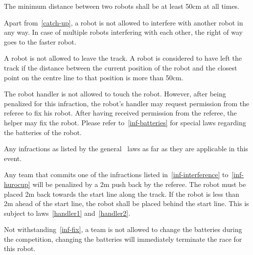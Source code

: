 \documentclass[12pt]{hurocup}
\begin{document}
\begin{decisions}
\item The minimum distance between two robots shall be at least 50cm
  at all times. 
\end{decisions}


\begin{lawlist}[MR]

\item \label{inf-interference} Apart from~\ref{catch-up}, a robot is
  not allowed to interfere with another robot in any way. In case of
  multiple robots interfering with each other, the right of way goes
  to the faster robot.

\item A robot is not allowed to leave the track. A robot is considered
  to have left the track if the distance between the current position
  of the robot and the closest point on the centre line to that
  position is more than 50cm.

\item \label{inf-fix} The robot handler is not allowed to touch the
  robot. However, after being penalized for this infraction, the
  robot's handler may request permission from the referee to fix his
  robot. After having received permission from the referee, the helper
  may fix the robot. Please refer to~\ref{inf-batteries} for special
  laws regarding the batteries of the robot.

\item \label{inf-hurocup} Any infractions as listed by the general
  \HuroCup\ laws as far as they are applicable in this event.

\item Any team that commits one of the infractions listed
  in~\ref{inf-interference} to~\ref{inf-hurocup} will be penalized by
  a 2m push back by the referee. The robot must be placed 2m back
  towards the start line along the track. If the robot is less than 2m
  ahead of the start line, the robot shall be placed behind the start
  line. This is subject to laws~\ref{handler1} and~\ref{handler2}.

\item \label{inf-batteries} Not withstanding~\ref{inf-fix}, a team is
  not allowed to change the batteries during the competition, changing
  the batteries will immediately terminate the race for this robot.
\end{lawlist}

\end{document}
